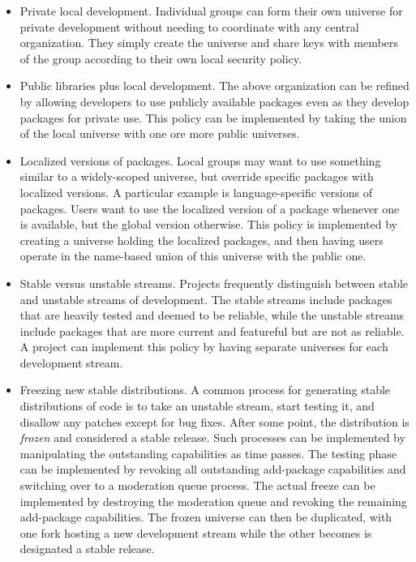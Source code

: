 \documentclass{IEEEtran}
\begin{document}
\begin{itemize}
\item Private local development.  Individual groups can form their own
      universe for private development without needing to coordinate
      with any central organization.  They simply create the universe
      and share keys with members of the group according to their
      own local security policy.

\item Public libraries plus local development.  The above organization
      can be refined by allowing developers to use publicly
      available packages even as they develop packages for private
      use.  This policy can be implemented by taking the union of the
      local universe with one ore more public universes.


\item Localized versions of packages.  Local groups may want to use
      something similar to a widely-scoped universe, but override
      specific packages with localized versions.  A particular example
      is language-specific versions of packages.  Users want to use
      the localized version of a package whenever one is available,
      but the global version otherwise.  This policy is implemented by
      creating a universe holding the localized packages, and then
      having users operate in the name-based union of this universe
      with the public one.

\item Stable versus unstable streams.  Projects frequently distinguish
      between stable and unstable streams of development.  The stable
      streams include packages that are heavily tested and deemed to
      be reliable, while the unstable streams include packages that
      are more current and featureful but are not as reliable.  A
      project can implement this policy by having separate universes
      for each development stream.  

\item Freezing new stable distributions.  A common process for
      generating stable distributions of code is to take an unstable
      stream, start testing it, and disallow any patches except for
      bug fixes.
      After some
      point, the distribution is \emph{frozen} and considered a stable
      release.  Such processes can be implemented by manipulating the
      outstanding capabilities as time passes.  The testing phase can
      be implemented by revoking all outstanding add-package
      capabilities and switching over to a moderation queue process.  The
      actual freeze can be implemented by destroying the moderation
      queue and revoking the remaining add-package capabilities.  The
      frozen universe can then be duplicated, with one fork hosting
      a new development stream while the other becomes is designated
      a stable release.
\end{itemize}
\end{document}
